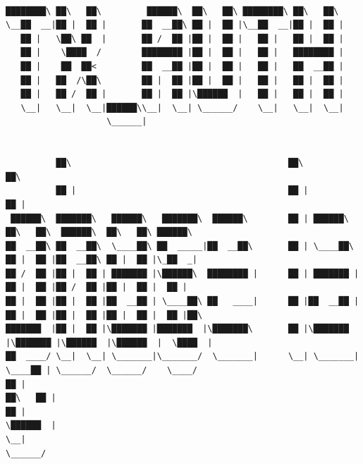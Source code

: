 \documentclass[varwidth=\maxdimen,margin=0.5cm,multi={verbatim}]{standalone}
\begin{document}
\begin{verbatim}

████████\ ██\   ██\         ██████\  ██\   ██\ ████████\ ██\   ██\
\__██  __|██ |  ██ |       ██  __██\ ██ |  ██ |\__██  __|██ |  ██ |
   ██ |   \██\ ██  |       ██ /  ██ |██ |  ██ |   ██ |   ██ |  ██ |
   ██ |    \████  /        ████████ |██ |  ██ |   ██ |   ████████ |
   ██ |    ██  ██<         ██  __██ |██ |  ██ |   ██ |   ██  __██ |
   ██ |   ██  /\██\        ██ |  ██ |██ |  ██ |   ██ |   ██ |  ██ |
   ██ |   ██ /  ██ |       ██ |  ██ |\██████  |   ██ |   ██ |  ██ |
   \__|   \__|  \__|██████\\__|  \__| \______/    \__|   \__|  \__|
                    \______|


          ██\                                           ██\                                           ██\
          ██ |                                          ██ |                                          ██ |
 ██████\  ███████\   ██████\   ███████\  ██████\        ██ | ██████\  ██\   ██\  ██████\  ██\   ██\ ██████\
██  __██\ ██  __██\  \____██\ ██  _____|██  __██\       ██ | \____██\ ██ |  ██ |██  __██\ ██ |  ██ |\_██  _|
██ /  ██ |██ |  ██ | ███████ |\██████\  ████████ |      ██ | ███████ |██ |  ██ |██ /  ██ |██ |  ██ |  ██ |
██ |  ██ |██ |  ██ |██  __██ | \____██\ ██   ____|      ██ |██  __██ |██ |  ██ |██ |  ██ |██ |  ██ |  ██ |██\
███████  |██ |  ██ |\███████ |███████  |\███████\       ██ |\███████ |\███████ |\██████  |\██████  |  \████  |
██  ____/ \__|  \__| \_______|\_______/  \_______|      \__| \_______| \____██ | \______/  \______/    \____/
██ |                                                                  ██\   ██ |
██ |                                                                  \██████  |
\__|                                                                   \______/



\end{verbatim}
\end{document}
